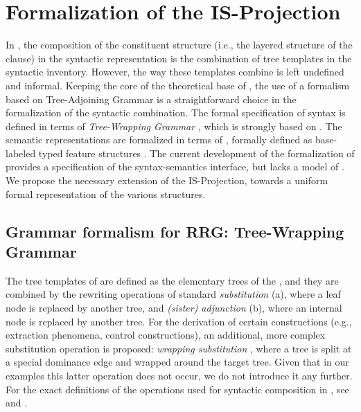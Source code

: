 \documentclass[output=paper,colorlinks,citecolor=brown]{langscibook}
\begin{document}
\section{Formalization of the IS-Projection }\label{sec:form.is:Balogh}

In , the composition of the constituent structure (i.e., the layered structure of the clause) in the syntactic representation is the combination of tree templates in the syntactic inventory. However, the way these templates combine is left undefined and informal. Keeping the core of the theoretical base of , the use of a formalism based on Tree-Adjoining Grammar \citep[;][]{joshi:schabes:97,ar:00} is a straightforward choice in the formalization of the syntactic combination. The formal specification of  syntax is defined in terms of \textit{Tree-Wrapping Grammar} \citep[;][]{kallm:etal:13,kallm:16}, which is strongly based on . The semantic representations are formalized in terms of  \citep[][]{barsalou:92,lobner:14,lobner:17,petersen:15}, formally defined as base-labeled typed feature structures \citep{kallm:ossw:13}. The current development of the formalization of  provides a specification of the syntax-semantics interface, but lacks a model of . We propose the necessary extension of the IS-Projection, towards a uniform formal representation of the various  structures.

\subsection{Grammar formalism for RRG: Tree-Wrapping Grammar }\label{sec:twg:Balogh}

The tree templates of  are defined as the elementary trees of the , and they are combined by the rewriting operations of standard \textit{substitution} (a), where a leaf node is replaced by another tree, and \textit{(sister) adjunction} (b), where an internal node is replaced by another tree. For the derivation of certain constructions (e.g., extraction phenomena, control constructions), an additional, more complex substitution operation is proposed: \textit{wrapping substitution} \citep[see][750]{kallm:ossw:23}, where a tree is split at a special dominance edge and wrapped around the target tree. Given that in our examples this latter operation does not occur, we do not introduce it any further. For the exact definitions of the operations used for syntactic composition in , see \citet{kallm:etal:13} and \citet{kallm:ossw:23}.
\end{document}
